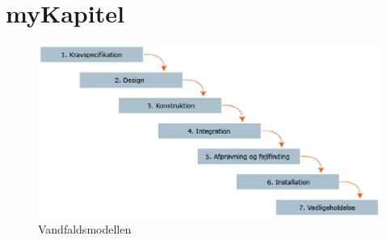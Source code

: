 \cfoot{\page\textbackslash \totalp} %
\chapter{myKapitel}

\begin{center}
\begin{figure}
\includegraphics[trim = 0mm 100mm 100mm 500mm]{./vandfaldmodel.eps}
\caption{Vandfaldsmodellen}
\end{figure}
\end{center}

